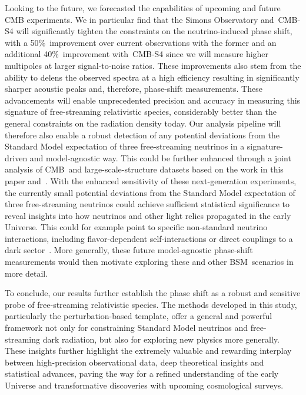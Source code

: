 Looking to the future, we forecasted the capabilities of upcoming and future CMB experiments. We in particular find that the Simons Observatory and~\mbox{CMB-S4} will significantly tighten the constraints on the neutrino-induced phase shift, with a 50\%~improvement over current observations with the former and an additional 40\%~improvement with~\mbox{CMB-S4} since we will measure higher multipoles at larger signal-to-noise ratios. These improvements also stem from the ability to delens the observed spectra at a high efficiency resulting in significantly sharper acoustic peaks and, therefore, phase-shift measurements. These advancements will enable unprecedented precision and accuracy in measuring this signature of free-streaming relativistic species, considerably better than the general constraints on the radiation density today. Our analysis pipeline will therefore also enable a robust detection of any potential deviations from the Standard Model expectation of three free-streaming neutrinos in a signature-driven and model-agnostic way. This could be further enhanced through a joint analysis of CMB~and large-scale-structure datasets based on the work in this paper and~\cite{Baumann:2017gkg, Baumann:2019keh, Whitford:2024ecj}. With the enhanced sensitivity of these next-generation experiments, the currently small potential deviations from the Standard Model expectation of three free-streaming neutrinos could achieve sufficient statistical significance to reveal insights into how neutrinos and other light relics propagated in the early Universe. This could for example point to specific non-standard neutrino interactions, including flavor-dependent self-interactions or direct couplings to a dark sector~\cite{Jeong:2013eza, Chacko:2016kgg, Buen-Abad:2017gxg, Green:2021gdc, Berryman:2022hds, Adshead:2022ovo, Buen-Abad:2024tlb, Kaplan:2024ydw}. More generally, these future model-agnostic phase-shift measurements would then motivate exploring these and other BSM~scenarios in more detail.\medskip

To conclude, our results further establish the phase shift as a robust and sensitive probe of free-streaming relativistic species. The methods developed in this study, particularly the perturbation-based template, offer a general and powerful framework not only for constraining Standard Model neutrinos and free-streaming dark radiation, but also for exploring new physics more generally. These insights further highlight the extremely valuable and rewarding interplay between high-precision observational data, deep theoretical insights and statistical advances, paving the way for a refined understanding of the early Universe and transformative discoveries with upcoming cosmological surveys.




